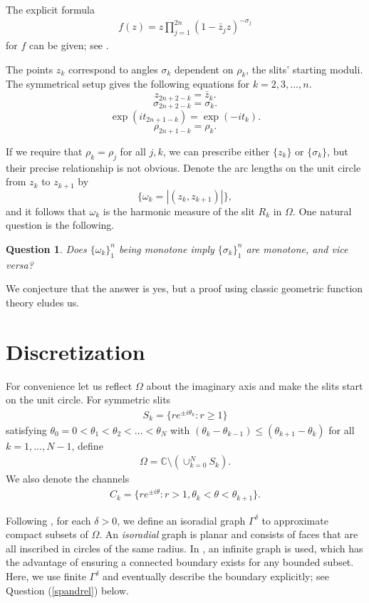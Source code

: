 \documentclass[]{amsart}
\newtheorem{ques}[thm]{Question}
\numberwithin{equation}{section}
\newcommand{\C}{\mathbb{C}}
\begin{document}
The explicit formula
  \begin{align} \label{f}
  f(z) = z \prod_{j=1}^{2n}(1-\bar{z}_jz)^{-\sigma_j}
  \end{align}
 for $f$ can be given; see \cite[Thm 3.18]{Pom}.


The points $z_k$ correspond to angles $\sigma_k$ dependent on $\rho_k$, the slits' starting moduli.  
The symmetrical setup gives the following equations for $k = 2, 3, ... ,n$.
  $$z_{2n+2-k} = \bar{z}_k.$$
  $$\sigma_{2n+2-k} = \sigma_k.$$
  $$\exp(it_{2n+1-k}) = \exp(-it_k).$$
  $$\rho_{2n+1-k} = \rho_k.$$

If we require that $\rho_k = \rho_j$ for all $j,k$, we can prescribe either $\{z_k\}$ or $\{\sigma_k\}$, but their precise relationship is not obvious.  Denote the arc lengths on the unit circle from $z_k$ to $z_{k+1}$ by
 $$\{\omega_k = |(z_k,z_{k+1})|\},$$
 and it follows that $\omega_k$ is the harmonic measure of the slit $R_k$ in $\varOmega$.
 One natural question is the following.
 \begin{ques} \label{question}
 Does $\{\omega_k\}_1^n$ being monotone imply $\{\sigma_k\}_1^n$ are monotone, and vice versa?
 \end{ques}
 
 We conjecture that the answer is yes, but a proof using classic geometric function theory eludes us.
\vskip10pt


\section{Discretization}


 For convenience let us reflect $\varOmega$ about the imaginary axis and make the slits start on the unit circle. 
 For symmetric slits
\begin{align}
S_k = \{ re^{\pm i \theta_k} :  r \ge 1\} 
\end{align}
satisfying $\theta_0 = 0 < \theta_1 < \theta_2 < ... < \theta_N$ with $(\theta_k - \theta_{k-1}) \leq (\theta_{k+1} - \theta_k)$ for all $k = 1, ... , N-1$, define
\begin{align}
\varOmega = \C \setminus \left( \cup_{k=0}^N S_k \right).
\end{align}
We also denote the channels
\begin{align}
C_k = \{ re^{\pm i \theta} :  r > 1, \theta_k < \theta < \theta_{k+1}\}. 
\end{align}


Following \cite{CS}, for each $\delta > 0$, we define an isoradial graph $\varGamma^{\delta}$ to approximate compact subsets of $\varOmega.$ An \textit{isoradial} graph is planar and consists of faces that are all inscribed in circles of the same radius.  In \cite{CS}, an infinite graph is used, which has the advantage of ensuring a connected boundary exists for any bounded subset.  Here, we use finite $\varGamma^{\delta}$ and eventually describe the boundary explicitly; see Question (\ref{spandrel}) below.
\end{document}
